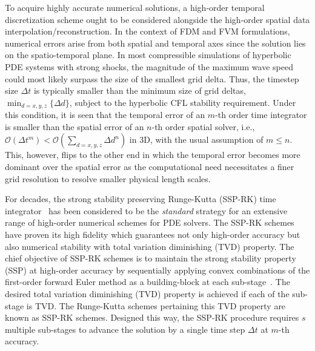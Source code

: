 \documentclass[times,preprint,3p]{elsarticle}
\begin{document}
To acquire highly accurate numerical solutions,
a high-order temporal discretization
scheme ought to be considered alongside
the high-order spatial data interpolation/reconstruction.
In the context of FDM and FVM formulations,
numerical errors arise from both spatial and temporal axes
since the solution lies on the spatio-temporal plane.
In most compressible simulations of hyperbolic PDE systems with strong shocks,
the magnitude of the maximum wave speed could most likely surpass the size of the
smallest grid delta. %
Thus, the timestep size $\Delta t$ is typically
smaller than the minimum size of grid deltas,
$\min_{d=x,y,z}\{\Delta d\}$,
subject to the hyperbolic CFL stability requirement.
%
Under this condition, it is seen that
the temporal error of an $m$-th order time integrator is
smaller than the spatial error of an $n$-th order spatial solver,
i.e.,
$\mathcal{O}(\Delta t^m) < \mathcal{O}(\sum_{d=x,y,z} \Delta d^n)$ in 3D,
with the usual assumption of $m \le n$.
%
This, however, flips to the other end in which
the temporal error becomes more dominant over the spatial error
as the computational need necessitates a finer grid resolution
to resolve smaller physical length scales.


For decades, the strong stability preserving Runge-Kutta (SSP-RK)
time integrator~\cite{gottlieb1998total, gottlieb2001strong, gottlieb2011strong}
has been considered to be the \textit{standard} strategy
for an extensive range of high-order numerical schemes for PDE solvers.
The SSP-RK schemes have proven its high fidelity which guarantees
not only high-order accuracy but also numerical
stability with total variation diminishing (TVD) property.
%
The chief objective of SSP-RK schemes is to maintain the strong stability property (SSP)
at high-order accuracy by sequentially applying convex combinations of
the first-order forward Euler method as a building-block
at each sub-stage~\cite{gottlieb2001strong}.
The desired total variation diminishing (TVD) property
is achieved if each of the sub-stage is TVD\@. The Runge-Kutta schemes
pertaining this TVD property are known as SSP-RK schemes.
%
Designed this way, the SSP-RK procedure requires $s$ multiple
sub-stages to advance the solution by
a single time step $\Delta t$ at $m$-th accuracy.
\end{document}
